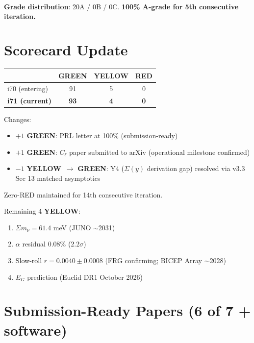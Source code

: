 \documentclass[11pt,a4paper]{article}
\newcommand{\GREEN}{\textcolor{dfdgreen}{\textbf{GREEN}}}
\newcommand{\YELLOW}{\textcolor{dfdyellow}{\textbf{YELLOW}}}
\newcommand{\RED}{\textcolor{dfdred}{\textbf{RED}}}
\begin{document}
\textbf{Grade distribution}: 20A / 0B / 0C. \textbf{100\% A-grade for 5th consecutive iteration.}


\section{Scorecard Update}
\label{sec:scorecard}

\begin{center}
\begin{tabular}{lccc}
\toprule
& \GREEN & \YELLOW & \RED \\
\midrule
i70 (entering) & 91 & 5 & 0 \\
\textbf{i71 (current)} & \textbf{93} & \textbf{4} & \textbf{0} \\
\bottomrule
\end{tabular}
\end{center}

Changes:
\begin{itemize}[nosep]
\item $+1$ \GREEN: PRL letter at 100\% (submission-ready)
\item $+1$ \GREEN: $C_\ell$ paper submitted to arXiv (operational milestone confirmed)
\item $-1$ \YELLOW\ $\to$ \GREEN: Y4 ($\Sigma(y)$ derivation gap) resolved via v3.3 Sec 13 matched asymptotics
\end{itemize}

Zero-RED maintained for 14th consecutive iteration.

Remaining 4 \YELLOW:
\begin{enumerate}[nosep]
\item $\Sigma m_\nu = 61.4$ meV (JUNO $\sim$2031)
\item $\alpha$ residual 0.08\% ($2.2\sigma$)
\item Slow-roll $r = 0.0040 \pm 0.0008$ (FRG confirming; BICEP Array $\sim$2028)
\item $E_G$ prediction (Euclid DR1 October 2026)
\end{enumerate}


\section{Submission-Ready Papers (6 of 7 + software)}
\label{sec:papers}
\end{document}
